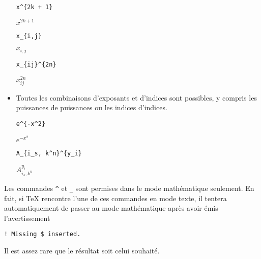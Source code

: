 \begin{itemize}
\begin{demo}
\begin{minipage}{0.3\linewidth}
\begin{texample}[0.6\linewidth]
\begin{lstlisting}
x^{2k + 1}
\end{lstlisting}
        \producing
        $x^{2k + 1}$
      \end{texample}
    \end{minipage}
    \quad
    \begin{minipage}{0.3\linewidth}
      \begin{texample}[0.6\linewidth]
\begin{lstlisting}
x_{i,j}
\end{lstlisting}
        \producing
        $x_{i,j}$
      \end{texample}
    \end{minipage}
    \quad
    \begin{minipage}{0.3\linewidth}
      \begin{texample}[0.63\linewidth]
\begin{lstlisting}
x_{ij}^{2n}
\end{lstlisting}
        \producing
        $x_{ij}^{2n}$
      \end{texample}
    \end{minipage}
  \end{demo}
\item Toutes les combinaisons d'exposants et d'indices sont possibles,
  y compris les puissances de puissances ou les indices d'indices.
  \begin{demo}
    \begin{minipage}{0.3\linewidth}
      \begin{texample}[0.6\linewidth]
\begin{lstlisting}
e^{-x^2}
\end{lstlisting}
        \producing
        $e^{-x^2}$
      \end{texample}
    \end{minipage}
    \quad
    \begin{minipage}{0.6\linewidth}
      \begin{texample}[0.6\linewidth]
\begin{lstlisting}
A_{i_s, k^n}^{y_i}
\end{lstlisting}
        \producing
        $A_{i_s,k^n}^{y_i}$
      \end{texample}
    \end{minipage}
    \quad \mbox{}     %
  \end{demo}
\end{itemize}

\begin{important}
  Les commandes \verb=^= et \verb=_= sont permises dans le mode
  mathématique seulement. En fait, si {\TeX} rencontre l'une de ces
  commandes en mode texte, il tentera automatiquement de passer au
  mode mathématique après avoir émis l'avertissement
\begin{verbatim}
! Missing $ inserted.
\end{verbatim}
  Il est assez rare que le résultat soit celui souhaité.
\end{important}

